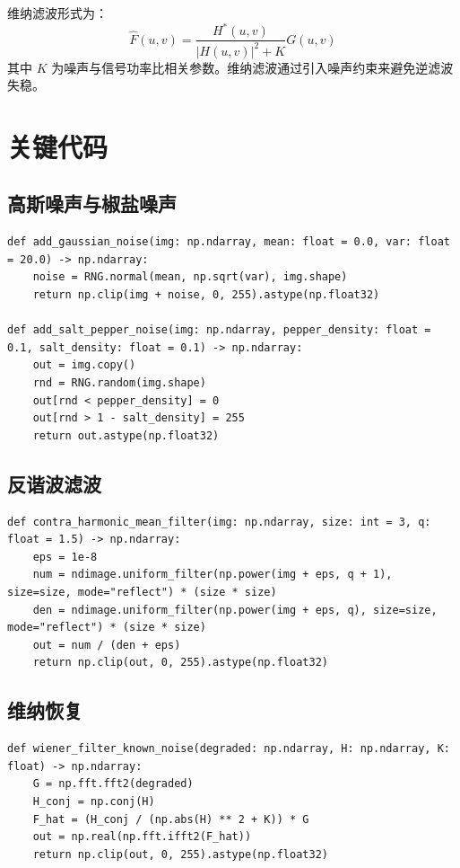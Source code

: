 \documentclass[UTF8,a4paper,12pt]{ctexart}
\begin{document}
维纳滤波形式为：
\begin{equation}
\hat{F}(u,v)=
\frac{H^*(u,v)}{|H(u,v)|^2+K}G(u,v)
\end{equation}
其中 $K$ 为噪声与信号功率比相关参数。维纳滤波通过引入噪声约束来避免逆滤波失稳。

\section{关键代码}
\subsection{高斯噪声与椒盐噪声}
\begin{lstlisting}[style=py]
def add_gaussian_noise(img: np.ndarray, mean: float = 0.0, var: float = 20.0) -> np.ndarray:
    noise = RNG.normal(mean, np.sqrt(var), img.shape)
    return np.clip(img + noise, 0, 255).astype(np.float32)

def add_salt_pepper_noise(img: np.ndarray, pepper_density: float = 0.1, salt_density: float = 0.1) -> np.ndarray:
    out = img.copy()
    rnd = RNG.random(img.shape)
    out[rnd < pepper_density] = 0
    out[rnd > 1 - salt_density] = 255
    return out.astype(np.float32)
\end{lstlisting}

\subsection{反谐波滤波}
\begin{lstlisting}[style=py]
def contra_harmonic_mean_filter(img: np.ndarray, size: int = 3, q: float = 1.5) -> np.ndarray:
    eps = 1e-8
    num = ndimage.uniform_filter(np.power(img + eps, q + 1), size=size, mode="reflect") * (size * size)
    den = ndimage.uniform_filter(np.power(img + eps, q), size=size, mode="reflect") * (size * size)
    out = num / (den + eps)
    return np.clip(out, 0, 255).astype(np.float32)
\end{lstlisting}

\subsection{维纳恢复}
\begin{lstlisting}[style=py]
def wiener_filter_known_noise(degraded: np.ndarray, H: np.ndarray, K: float) -> np.ndarray:
    G = np.fft.fft2(degraded)
    H_conj = np.conj(H)
    F_hat = (H_conj / (np.abs(H) ** 2 + K)) * G
    out = np.real(np.fft.ifft2(F_hat))
    return np.clip(out, 0, 255).astype(np.float32)
\end{lstlisting}
\end{document}
